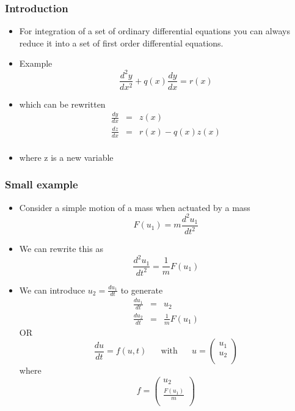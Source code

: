 \documentclass[10pt]{beamer}
\begin{document}
\begin{frame}
  \frametitle{Introduction}
  \begin{itemize}
  \item For integration of a set of ordinary differential equations
    you can always reduce it into a set of first order differential
    equations. 
  \item Example
    \[
      \frac{d^2 y}{d x^2} + q(x) \frac{dy}{dx} = r(x)
    \]
  \item which can be rewritten
    \[
      \begin{array}{rcl}
        \frac{dy}{dx} & = & z(x)\\
        \frac{dz}{dx} & = & r(x)  - q(x) z(x) \\
      \end{array}
    \]
  \item where z is a new variable
  \end{itemize}
\end{frame}

\begin{frame}
  \frametitle{Small example}
  \begin{itemize}
  \item Consider a simple motion of a mass when actuated by a mass
    \[
      F(u_1) = m \frac{ d^2 u_1 }{ d t^2 }
    \]
  \item We can rewrite this as
    \[
      \frac{d^2 u_1}{d t^2} = \frac{1}{m} F(u_1)
    \]
  \item We can introduce $u_2 = \frac{du_1}{dt}$ to generate
    \[
      \begin{array}{rcl}
        \frac{du_1}{dt} & = & u_2\\
        \frac{du_2}{dt} & = & \frac{1}{m} F(u_1)
      \end{array}
    \] OR
    \[
      \frac{du}{dt} = f( u, t) \mbox{~~~~ with ~~~~} u = \left(
        \begin{array}{c}
          u_1 \\ u_2\\
        \end{array} \right)
    \]
    where
    \[
      f = \left(
        \begin{array}{c}
          u_2\\
          \frac{F(u_1)}{m}\\
        \end{array} \right)
    \]
  \end{itemize}
\end{frame}
\end{document}
